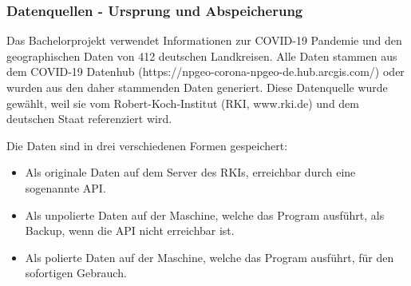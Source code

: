 \subsubsection{Datenquellen - Ursprung und Abspeicherung}
Das Bachelorprojekt verwendet Informationen zur COVID-19 Pandemie und den geographischen Daten von 412 deutschen Landkreisen. Alle Daten stammen aus dem \glqq{}COVID-19 Datenhub\grqq{} (https://npgeo-corona-npgeo-de.hub.arcgis.com/) oder wurden aus den daher stammenden Daten generiert. Diese Datenquelle wurde gewählt, weil sie vom Robert-Koch-Institut (RKI, www.rki.de) und dem deutschen Staat referenziert wird.

Die Daten sind in drei verschiedenen Formen gespeichert:
\begin{itemize}
    \item Als originale Daten auf dem Server des RKIs, erreichbar durch eine sogenannte API.
    \item Als unpolierte Daten auf der Maschine, welche das Program ausführt, als Backup, wenn die API nicht erreichbar ist.
    \item Als polierte Daten auf der Maschine, welche das Program ausführt, für den sofortigen Gebrauch.
\end{itemize}
